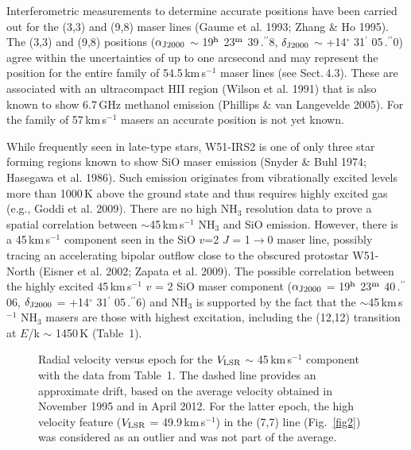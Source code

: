 \documentclass[oldversion]{aa}
\def\ffas {\hbox{$\,.\!\!^{\prime\prime}$}}
\def\ffas {\hbox{$\,.\!\!^{\prime\prime}$}}
\begin{document}
Interferometric measurements to determine accurate positions 
have been carried out for the (3,3) and (9,8) maser lines 
(Gaume et al. 1993; Zhang \& Ho 1995). The (3,3) and (9,8) 
positions ($\alpha_{\rm J2000}$ $\sim$ 19$^{\rm h}$ 23$^{\rm m}$ 
39\ffas8, $\delta_{\rm J2000}$ $\sim$ +14$^{\circ}$ 31$^{\prime}$ 
05\ffas0) agree within the uncertainties of up to one arcsecond 
and may represent the position for the entire family of 
54.5\,km\,s$^{-1}$ maser lines (see Sect.\,4.3). These are 
associated with an ultracompact HII region (Wilson 
et al. 1991) that is also known to show 6.7\,GHz methanol 
emission (Phillips \& van Langevelde 2005). For the family
of 57\,km\,s$^{-1}$ masers an accurate position is not 
yet known. 

While frequently seen in late-type stars, W51-IRS2 is one 
of only three star forming regions known to show SiO maser emission
(Snyder \& Buhl 1974; Hasegawa et al. 1986). Such emission 
originates from vibrationally excited levels more than 1000\,K 
above the ground state and thus requires highly excited gas
(e.g., Goddi et al. 2009). There are no high NH$_3$ resolution 
data to prove a spatial correlation between $\sim$45\,km\,s$^{-1}$ 
NH$_3$ and SiO emission. However, there is a 45\,km\,s$^{-1}$ 
component seen in the SiO $v$=2 $J$ = 1$\rightarrow$0 maser line, 
possibly tracing an accelerating bipolar outflow close to 
the obscured protostar W51-North (Eisner et al. 2002; Zapata 
et al. 2009). The possible correlation between the highly excited 
45\,km\,s$^{-1}$ $v$ = 2 SiO maser component ($\alpha_{\rm J2000}$ 
= 19$^{\rm h}$ 23$^{\rm m}$ 40\ffas06, $\delta_{\rm J2000}$ = 
+14$^{\circ}$ 31$^{\prime}$ 05\ffas6) and NH$_3$ is supported
by the fact that the $\sim$45\,km\,s$^{-1}$ NH$_3$ masers are 
those with highest excitation, including the (12,12) transition at 
$E$/k $\sim$ 1450\,K (Table~1). 


\begin{figure}[t]
\vspace{0.0cm}
\centering
{}
\vspace{-0.0cm}
\caption{Radial velocity versus epoch for the $V_{\rm LSR}$ $\sim$ 45\,km\,s$^{-1}$
component with the data from Table~1. The dashed line provides an approximate
drift, based on the average velocity obtained in November 1995 and in April 2012.
For the latter epoch, the high velocity feature ($V_{\rm LSR}$ = 49.9\,km\,s$^{-1}$)
in the (7,7) line (Fig.~\ref{fig2}) was considered as an outlier and was not part 
of the average. 
\label{fig12}}
\end{figure}
\end{document}
